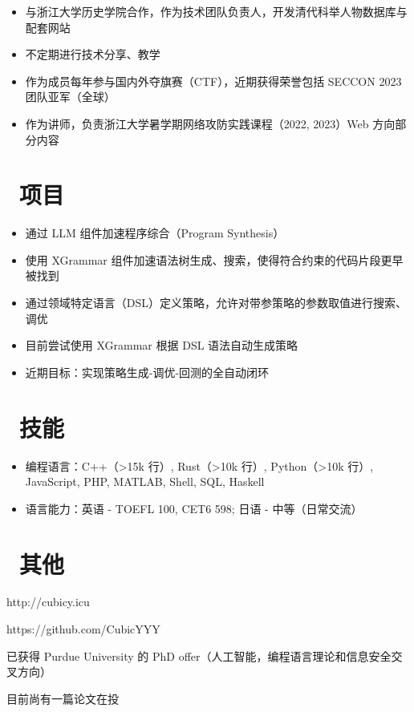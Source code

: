 \documentclass{resume}
\begin{document}
\begin{itemize}
  \item 与浙江大学历史学院合作，作为技术团队负责人，开发清代科举人物数据库与配套网站
  \item 不定期进行技术分享、教学
\end{itemize}

\begin{itemize}
  \item 作为成员每年参与国内外夺旗赛（CTF），近期获得荣誉包括 SECCON 2023 团队亚军（全球）
  \item 作为讲师，负责浙江大学暑学期网络攻防实践课程（2022, 2023）Web 方向部分内容
\end{itemize}

\section{\faCogs\ 项目}

\begin{itemize}
  \item 通过 LLM 组件加速程序综合（Program Synthesis）
  \item 使用 XGrammar 组件加速语法树生成、搜索，使得符合约束的代码片段更早被找到
\end{itemize}

\begin{itemize}
  \item 通过领域特定语言（DSL）定义策略，允许对带参策略的参数取值进行搜索、调优
  \item 目前尝试使用 XGrammar 根据 DSL 语法自动生成策略
  \item 近期目标：实现策略生成-调优-回测的全自动闭环
\end{itemize}

\section{\faCogs\ 技能}
\begin{itemize}[parsep=0.5ex]
  \item 编程语言：C++（>15k 行）, Rust（>10k 行）, Python（>10k 行）, JavaScript, PHP, MATLAB, Shell, SQL, Haskell
  \item 语言能力：英语 - TOEFL 100, CET6 598; 日语 - 中等（日常交流）
\end{itemize}

\section{\faInfo\ 其他}
\begin{description}[parsep=0.5ex]
  \item[个人博客] http://cubicy.icu
  \item[GitHub] https://github.com/CubicYYY
  \item[升学] 已获得 Purdue University 的 PhD offer（人工智能，编程语言理论和信息安全交叉方向）
  \item[论文] 目前尚有一篇论文在投
\end{description}
\end{document}
